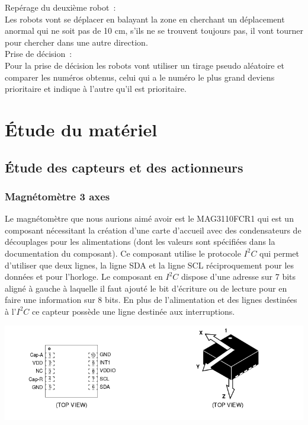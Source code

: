 \documentclass{article}
\begin{document}
Repérage du deuxième robot~: \\

Les robots vont se déplacer en balayant la zone en cherchant un déplacement anormal qui ne soit pas de 10 cm, s’ils ne se trouvent toujours pas, il vont tourner pour chercher dans une autre direction. \\

Prise de décision~: \\

Pour la prise de décision les robots vont utiliser un tirage pseudo aléatoire et comparer les numéros obtenus, celui qui a le numéro le plus grand deviens prioritaire et indique à l’autre qu’il est prioritaire.

\section{Étude du matériel}

\subsection{Étude des capteurs et des actionneurs}

\subsubsection{Magnétomètre 3 axes}

Le magnétomètre que nous aurions aimé avoir est le MAG3110FCR1 qui est un composant nécessitant la création d'une carte d’accueil avec des condensateurs de découplages pour les alimentations (dont les valeurs sont spécifiées dans la documentation du composant). Ce composant utilise le protocole $I^2C$ qui permet d'utiliser que deux lignes, la ligne SDA et la ligne SCL réciproquement pour les données et pour l'horloge. Le composant en $I^2C$ dispose d'une adresse sur 7 bits aligné à gauche à laquelle il faut ajouté le bit d'écriture ou de lecture pour en faire une information sur 8 bits. En plus de l'alimentation et des lignes destinées à l'$I^2C$ ce capteur possède une ligne destinée aux interruptions.

\begin{center}
  \includegraphics[width=17cm]{mag_schematic.png}
\end{center}
\end{document}
